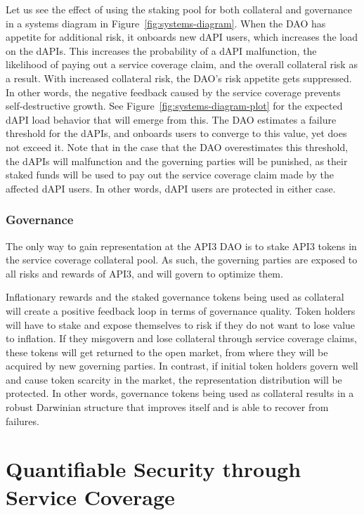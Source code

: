 \documentclass[11pt]{article}
\begin{document}
Let us see the effect of using the staking pool for both collateral and governance in a systems diagram in Figure~\ref{fig:systems-diagram}.
When the DAO has appetite for additional risk, it onboards new dAPI users, which increases the load on the dAPIs.
This increases the probability of a dAPI malfunction, the likelihood of paying out a service coverage claim, and the overall collateral risk as a result.
With increased collateral risk, the DAO’s risk appetite gets suppressed.
In other words, the negative feedback caused by the service coverage prevents self-destructive growth.
See Figure~\ref{fig:systems-diagram-plot} for the expected dAPI load behavior that will emerge from this.
The DAO estimates a failure threshold for the dAPIs, and onboards users to converge to this value, yet does not exceed it.
Note that in the case that the DAO overestimates this threshold, the dAPIs will malfunction and the governing parties will be punished, as their staked funds will be used to pay out the service coverage claim made by the affected dAPI users.
In other words, dAPI users are protected in either case.

\subsubsection{Governance}
\label{sec:governance}

The only way to gain representation at the API3 DAO is to stake API3 tokens in the service coverage collateral pool.
As such, the governing parties are exposed to all risks and rewards of API3, and will govern to optimize them.

Inflationary rewards and the staked governance tokens being used as collateral will create a positive feedback loop in terms of governance quality.
Token holders will have to stake and expose themselves to risk if they do not want to lose value to inflation.
If they misgovern and lose collateral through service coverage claims, these tokens will get returned to the open market, from where they will be acquired by new governing parties.
In contrast, if initial token holders govern well and cause token scarcity in the market, the representation distribution will be protected.
In other words, governance tokens being used as collateral results in a robust Darwinian structure that improves itself and is able to recover from failures.


\section{Quantifiable Security through Service Coverage}
\label{sec:quantifiable-security-through-service-coverage}
\end{document}
